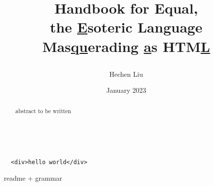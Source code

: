 \documentclass{report}
\title{
  
Handbook for Equal, \\ 
the \underline{E}soteric Language Mas\underline{qu}erading \underline{a}s HTM\underline{L}
}
\author{Hechen Liu}
\date{January 2023}
\begin{document}
\lstset{language=HTML}
\maketitle
\begin{abstract}
  abstract to be written
\end{abstract}
\tableofcontents
\
\begin{lstlisting}
  <div>hello world</div>
\end{lstlisting}
readme + grammar
\end{document}
